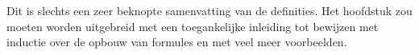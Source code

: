 \documentclass[../../../include/open-logic-chapter]{subfiles}
\begin{document}

\begin{editorial}
  Dit is slechts een zeer beknopte samenvatting van de definities. Het
  hoofdstuk zou moeten worden uitgebreid met een toegankelijke inleiding
  tot bewijzen met inductie over de opbouw van formules en met veel meer
  voorbeelden.
\end{editorial}







\OLEndChapterHook
\end{document}
